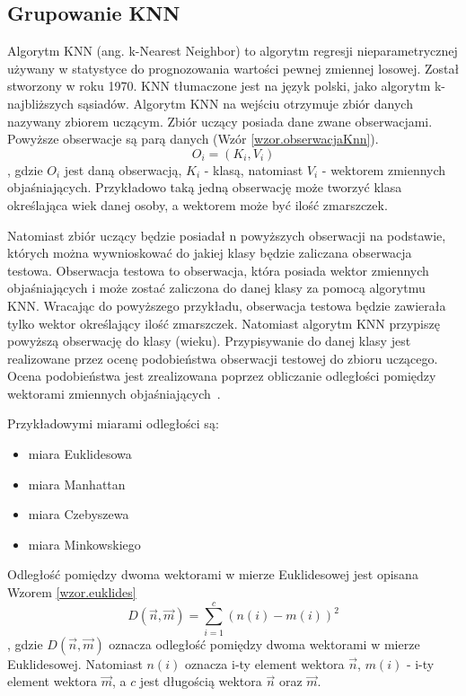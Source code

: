 \documentclass[a4paper,twoside,12pt]{book}
\begin{document}
    \subsection{Grupowanie KNN}\label{subsec:grupowanie-knn}
    Algorytm KNN (ang. k-Nearest Neighbor) to algorytm regresji
    nieparametrycznej używany w statystyce do
    prognozowania wartości pewnej zmiennej losowej. Został stworzony w roku 1970.
    KNN tłumaczone jest na język polski, jako algorytm k- najbliższych sąsiadów.
    Algorytm KNN na wejściu otrzymuje zbiór danych nazywany zbiorem uczącym.
    Zbiór uczący posiada dane zwane obserwacjami. Powyższe obserwacje są parą danych (Wzór \ref{wzor.obserwacjaKnn}).
    \large
    \begin{equation}
        O_{i} = (K_{i}, V_{i})
        \label{wzor.obserwacjaKnn}
    \end{equation}
    \normalsize
    , gdzie $O_{i}$ jest daną obserwacją, $K_{i}$ - klasą, natomiast $V_{i}$ - wektorem zmiennych objaśniających.
    Przykładowo taką jedną obserwację może tworzyć klasa określająca wiek danej osoby, a wektorem może być ilość
    zmarszczek.

    Natomiast zbiór uczący będzie posiadał n powyższych obserwacji na podstawie, których można wywnioskować do jakiej
    klasy będzie zaliczana obserwacja testowa. Obserwacja testowa to obserwacja, która posiada wektor zmiennych
    objaśniających i może zostać zaliczona do danej klasy za pomocą algorytmu KNN.
    Wracając do powyższego przykładu, obserwacja testowa będzie zawierała tylko wektor określający ilość zmarszczek.
    Natomiast algorytm KNN przypiszę powyższą obserwację do klasy (wieku).
    Przypisywanie do danej klasy jest realizowane przez ocenę podobieństwa obserwacji testowej do zbioru uczącego.
    Ocena podobieństwa jest zrealizowana poprzez obliczanie odległości pomiędzy wektorami zmiennych
    objaśniających~\cite{knnOpis}.

    Przykładowymi miarami odległości są:
    \begin{itemize}
        \item miara Euklidesowa
        \item miara Manhattan
        \item miara Czebyszewa
        \item miara Minkowskiego
    \end{itemize}
    Odległość pomiędzy dwoma wektorami w mierze Euklidesowej jest opisana Wzorem \ref{wzor.euklides}
    \large
    \begin{equation}
        D(\overrightarrow{n},\overrightarrow{m})=\sum_{i=1}^{c}(n(i)-m(i))^{2}
        \label{wzor.euklides}
    \end{equation}
    \normalsize
    , gdzie $D(\overrightarrow{n},\overrightarrow{m})$ oznacza odległość pomiędzy dwoma wektorami w mierze Euklidesowej.
    Natomiast $n(i)$ oznacza i-ty element wektora $\overrightarrow{n}$,  $m(i)$ - i-ty element wektora
    $\overrightarrow{m}$, a $c$ jest długością wektora  $\overrightarrow{n}$ oraz $\overrightarrow{m}$.
\end{document}
